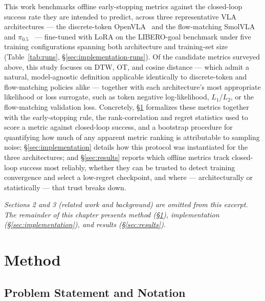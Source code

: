 \documentclass[11pt]{article}
\numberwithin{equation}{section}
\numberwithin{table}{section}
\numberwithin{figure}{section}
\begin{document}
This work benchmarks offline early-stopping metrics against the closed-loop success rate they are
intended to predict, across three representative VLA architectures --- the discrete-token
OpenVLA~\cite{kim2024openvla} and the flow-matching SmolVLA~\cite{shukor2025smolvla} and
$\pi_{0.5}$~\cite{black2025pi05} --- fine-tuned with LoRA on the LIBERO-goal benchmark
\cite{liu2023libero} under five training configurations spanning both architecture and training-set size
(Table~\ref{tab:runs}, \S\ref{sec:implementation-runs}). Of the candidate metrics surveyed above, this
study focuses on DTW, OT, and cosine distance --- which admit a natural, model-agnostic definition
applicable identically to discrete-token and flow-matching policies alike --- together with each
architecture's most appropriate likelihood or loss surrogate, such as token negative log-likelihood, $L_1$/$L_2$,
or the flow-matching validation loss. Concretely, \S\ref{sec:method} formalizes these metrics together with the
early-stopping rule, the rank-correlation and regret statistics used to score a metric against closed-loop
success, and a bootstrap procedure for quantifying how much of any apparent metric ranking is attributable
to sampling noise; \S\ref{sec:implementation} details how this protocol was instantiated for the three
architectures; and \S\ref{sec:results} reports which offline metrics track closed-loop success most
reliably, whether they can be trusted to detect training convergence and select a low-regret checkpoint,
and where --- architecturally or statistically --- that trust breaks down.

\bigskip
\noindent\textit{Sections 2 and 3 (related work and background) are omitted from this excerpt. The
remainder of this chapter presents method (\S\ref{sec:method}), implementation
(\S\ref{sec:implementation}), and results (\S\ref{sec:results}).}

\setcounter{section}{3}

\section{Method}
\label{sec:method}

\subsection{Problem Statement and Notation}
\label{sec:method-notation}
\end{document}
